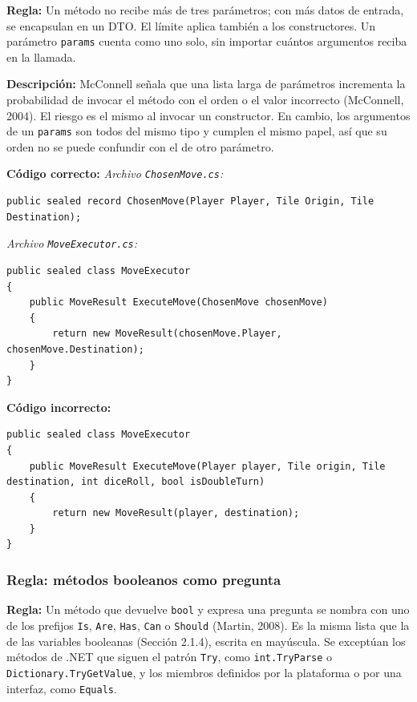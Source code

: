 \textbf{Regla:} Un método no recibe más de tres parámetros; con más datos de entrada, se encapsulan en un DTO. El límite aplica también a los constructores. Un parámetro \texttt{params} cuenta como uno solo, sin importar cuántos argumentos reciba en la llamada.

\textbf{Descripción:} McConnell señala que una lista larga de parámetros incrementa la probabilidad de invocar el método con el orden o el valor incorrecto (McConnell, 2004). El riesgo es el mismo al invocar un constructor. En cambio, los argumentos de un \texttt{params} son todos del mismo tipo y cumplen el mismo papel, así que su orden no se puede confundir con el de otro parámetro.

\textbf{Código correcto:}
\textit{Archivo \texttt{ChosenMove.cs}:}
\begin{lstlisting}[style=csharpstyle]
public sealed record ChosenMove(Player Player, Tile Origin, Tile Destination);
\end{lstlisting}

\textit{Archivo \texttt{MoveExecutor.cs}:}
\begin{lstlisting}[style=csharpstyle]
public sealed class MoveExecutor
{
    public MoveResult ExecuteMove(ChosenMove chosenMove)
    {
        return new MoveResult(chosenMove.Player, chosenMove.Destination);
    }
}
\end{lstlisting}

\textbf{Código incorrecto:}
\begin{lstlisting}[style=csharpstyle]
public sealed class MoveExecutor
{
    public MoveResult ExecuteMove(Player player, Tile origin, Tile destination, int diceRoll, bool isDoubleTurn)
    {
        return new MoveResult(player, destination);
    }
}
\end{lstlisting}

\subsubsection{Regla: métodos booleanos como pregunta}

\textbf{Regla:} Un método que devuelve \texttt{bool} y expresa una pregunta se nombra con uno de los prefijos \texttt{Is}, \texttt{Are}, \texttt{Has}, \texttt{Can} o \texttt{Should} (Martin, 2008). Es la misma lista que la de las variables booleanas (Sección 2.1.4), escrita en mayúscula. Se exceptúan los métodos de .NET que siguen el patrón \texttt{Try}, como \texttt{int.TryParse} o \texttt{Dictionary.TryGetValue}, y los miembros definidos por la plataforma o por una interfaz, como \texttt{Equals}.

